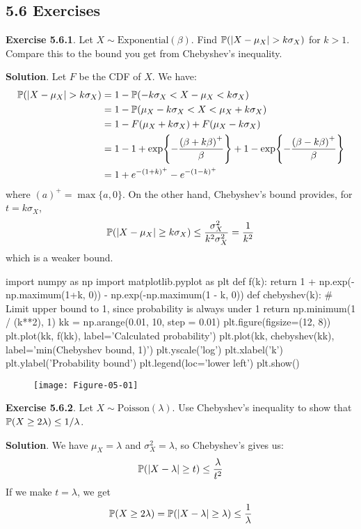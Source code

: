 \subsection*{5.6 Exercises}

\textbf{Exercise 5.6.1}. Let \(X \sim \text{Exponential}(\beta)\). Find
\(\operatorname{\mathbb{P}}(|X - \mu_X| > k \sigma_X)\) for \(k > 1\). Compare this to
the bound you get from Chebyshev's inequality.

\textbf{Solution}.
Let \(F\) be the CDF of \(X\). We have:
\begin{align*}
\PROB(|X - \mu_X| > k \sigma_X) &= 1 - \PROB(-k \sigma_X < X - \mu_X < k \sigma_X) \\
&= 1 - \PROB(\mu_X - k \sigma_X < X < \mu_X + k \sigma_X) \\
&= 1 - F(\mu_X + k \sigma_X) + F(\mu_X - k \sigma_X) \\
&= 1 - 1 + \exp\left\{ -\frac{\left(\beta + k \beta\right)^+}{\beta} \right\} + 1 - \exp\left\{-\frac{\left(\beta - k \beta\right)^+}{\beta} \right\} \\
&= 1 + e^{-(1+k)^+ } - e^{-(1-k)^+} 
\end{align*}
where \((a)^+ = \max \{ a, 0 \}\).
On the other hand, Chebyshev's bound provides, for \(t = k\sigma_X\),
\[
\operatorname{\mathbb{P}}(|X - \mu_X| \geq k \sigma_X) \leq \frac{\sigma_X^{2}}{k^{2} \sigma_X^{2}}  = \frac{1}{k^{2}}
\]
which is a weaker bound.

\begin{python}
import numpy as np
import matplotlib.pyplot as plt
def f(k):
    return 1 + np.exp(-np.maximum(1+k, 0)) - np.exp(-np.maximum(1 - k, 0))
def chebyshev(k):
    # Limit upper bound to 1, since probability is always under 1
    return np.minimum(1 / (k**2), 1)
kk = np.arange(0.01, 10, step = 0.01)
plt.figure(figsize=(12, 8))
plt.plot(kk, f(kk), label='Calculated probability')
plt.plot(kk, chebyshev(kk), label='min(Chebyshev bound, 1)')
plt.yscale('log')
plt.xlabel('k')
plt.ylabel('Probability bound')
plt.legend(loc='lower left')
plt.show()
\end{python}

\begin{figure}[H]
\centering
\texttt{[image: Figure-05-01]}
\end{figure}


\textbf{Exercise 5.6.2}. Let \(X \sim \text{Poisson}(\lambda)\). Use
Chebyshev's inequality to show that
\(\operatorname{\mathbb{P}}(X \geq 2\lambda) \leq 1 / \lambda\).

\textbf{Solution}. We have \(\mu_X = \lambda\) and
\(\sigma_X^{2} = \lambda\), so Chebyshev's gives us:
\[
\operatorname{\mathbb{P}}(|X - \lambda| \geq t) \leq \frac{\lambda}{t^{2}}
\]
If we make \(t = \lambda\), we get
\[
\operatorname{\mathbb{P}}(X \geq 2\lambda) = \operatorname{\mathbb{P}}(|X - \lambda| \geq \lambda) \leq \frac{1}{\lambda}
\]


